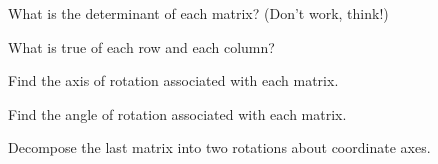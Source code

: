 \documentclass[../gatm_answers.tex]{subfiles}
\begin{document}
\begin{inner_problem}[start=1]
\item What is the determinant of each matrix? (Don't work, think!)
\end{inner_problem}

\begin{inner_problem}
\item What is true of each row and each column?
\end{inner_problem}

\begin{inner_problem}
\item Find the axis of rotation associated with each matrix.
\end{inner_problem}

\begin{inner_problem}
\item Find the angle of rotation associated with each matrix.
\end{inner_problem}

\begin{inner_problem}
\item Decompose the last matrix into two rotations about coordinate axes.
\end{inner_problem}
\end{document}
